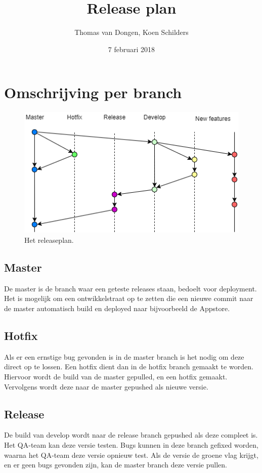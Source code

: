 \documentclass[12pt]{article}
\title{Release plan}
\author{Thomas van Dongen, Koen Schilders}
\date{7 februari 2018}
\begin{document}
\begin{titlepage}
\maketitle
\end{titlepage}



\section{Omschrijving per branch}
\begin{figure}[H]
	\includegraphics[width=\textwidth]{images/SOP6_Release.png}
	\caption{Het releaseplan.}
\end{figure}
\subsection{Master}
De master is de branch waar een geteste releases staan, bedoelt voor deployment. Het is mogelijk om een ontwikkelstraat op te zetten die een nieuwe commit naar de master automatisch build en deployed naar bijvoorbeeld de Appstore.
\subsection{Hotfix}
Als er een ernstige bug gevonden is in de master branch is het nodig om deze direct op te lossen. Een hotfix dient dan in de hotfix branch gemaakt te worden. Hiervoor wordt de build van de master gepulled, en een hotfix gemaakt. Vervolgens wordt deze naar de master gepushed als nieuwe versie.
\subsection{Release}
De build van develop wordt naar de release branch gepushed als deze compleet is. Het QA-team kan deze versie testen. Bugs kunnen in deze branch gefixed worden, waarna het QA-team deze versie opnieuw test. Als de versie de groene vlag krijgt, en er geen bugs gevonden zijn, kan de master branch deze versie pullen.
\end{document}

